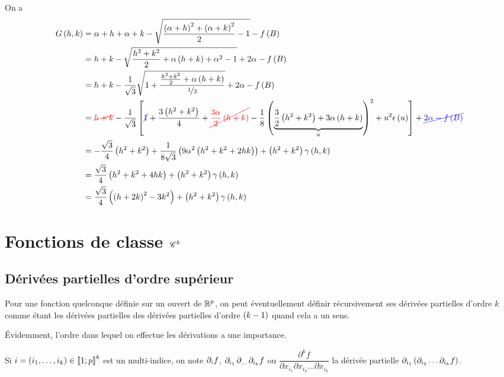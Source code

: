 \begin{corr}
On a \[\begin{aligned}
G\left(h,k\right)&=\alpha+h+\alpha+k-\sqrt{\dfrac{\left(\alpha+h\right)^2+\left(\alpha+k\right)^2}{2}-1}-f\left(B\right) \\
&=h+k-\sqrt{\dfrac{h^2+k^2}{2}+\alpha\left(h+k\right)+\alpha^2-1}+2\alpha-f\left(B\right) \\
&=h+k-\dfrac{1}{\sqrt{3}}\sqrt{1+\dfrac{\frac{h^2+k^2}{2}+\alpha\left(h+k\right)}{\nicefrac{1}{3}}}+2\alpha-f\left(B\right) \\
&=\textcolor{red}{\cancel{h+k}}-\dfrac{1}{\sqrt{3}}\left[\textcolor{blue}{\cancel{1}}+\dfrac{3\left(h^2+k^2\right)}{4}+\textcolor{red}{\cancel{\dfrac{3\alpha}{2}\left(h+k\right)}}-\dfrac{1}{8}\left(\underbrace{\dfrac{3}{2}\left(h^2+k^2\right)+3\alpha\left(h+k\right)}_{u}\right)^2+u^2\epsilon\left(u\right)\right]+\textcolor{blue}{\cancel{2\alpha-f\left(B\right)}} \\
&=-\dfrac{\sqrt{3}}{4}\left(h^2+k^2\right)+\dfrac{1}{8\sqrt{3}}\left(9\alpha^2\left(h^2+k^2+2hk\right)\right)+\left(h^2+k^2\right)\gamma\left(h,k\right) \\
&=\dfrac{\sqrt{3}}{4}\left(h^2+k^2+4hk\right)+\left(h^2+k^2\right)\gamma\left(h,k\right) \\
&=\dfrac{\sqrt{3}}{4}\left(\left(h+2k\right)^2-3k^2\right)+\left(h^2+k^2\right)\gamma\left(h,k\right)
\end{aligned}\]

\end{corr}

\section{Fonctions de classe \(\mathscr{C}^{k}\)}

\subsection{Dérivées partielles d'ordre supérieur}

Pour une fonction quelconque définie sur un ouvert de \(\mathbb{R}^p\), on peut éventuellement définir récursivement ses dérivées partielles d'ordre \(k\) comme étant les dérivées partielles des dérivées partielles d'ordre \(\left(k-1\right)\) quand cela a un sens.

Évidemment, l'ordre dans lequel on effectue les dérivations a une importance.

Si \(i=\left(i_1,\dots,i_k\right)\in\left\llbracket1;p\right\rrbracket^k\) est un multi-indice, on note \(\pdif{i}f\), \(\pdif{i_1,\dots,i_k}f\) ou \(\dfrac{\partial^kf}{\partial x_{i_1}\partial x_{i_2}\dots\partial x_{i_k}}\) la dérivée partielle \(\pdif{i_1}\paren{\pdif{i_2}\dots\pdif{i_k}f}\).


